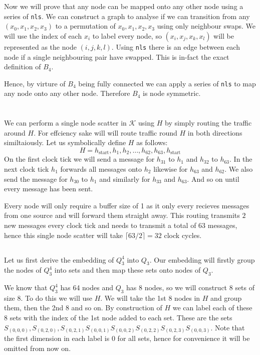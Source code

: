 Now we will prove that any node can be mapped onto any other node using a series of \texttt{nls}.
We can construct a graph to analyse if we can transition from any $(x_0, x_1, x_2, x_3)$ to a permutation of $x_0, x_1, x_2, x_3$ using only neighbour swaps.
We will use the index of each $x_i$ to label every node, so $(x_i, x_j, x_k, x_l)$ will be represented as the node $(i,j,k,l)$.
Using \texttt{nls} there is an edge between each node if a single neighbouring pair have swapped.
This is in-fact the exact definition of $B_4$.

Hence, by virture of $B_4$ being fully connected we can apply a series of \texttt{nls} to map any node onto any other node. Therefore $B_4$ is node symmetric.

\section{}
\subsection{}
We can perform a single node scatter in $\mathcal{K}$ using $H$  by simply routing the traffic around $H$.
For effciency sake will will route traffic round $H$ in both directions similtaiously.
Let us symbolically define $H$ as follows:
\[
H = h_{\text{start}}, h_1, h_2, \ldots, h_{62}, h_{63}, h_{\text{start}}
\]
On the first clock tick we will send a message for $h_{31}$ to $h_1$ and $h_{32}$ to $h_63$.
In the next clock tick $h_1$ forwards all messages onto $h_2$ likewise for $h_{63}$ and $h_{62}$.
We also send the message for $h_{30}$ to $h_1$ and similarly for $h_{33}$ and $h_{63}$.
And so on until every message has been sent.

Every node will only require a buffer size of 1 as it only every recieves messages from one source and will forward them straight away.
This routing transmits $2$ new messages every clock tick and needs to transmit a total of $63$ messages, hence this single node scatter will take $\lceil 63/2 \rceil=32$ clock cycles.


\subsection{}
Let us first derive the embedding of $Q^4_3$ into $Q_3$.
Our embedding will firstly group the nodes of $Q_3^4$ into sets and then map these sets onto nodes of $Q_3$.

We know that $Q^4_3$ has 64 nodes and $Q_3$ has 8 nodes, so we will construct 8 sets of size 8.
To do this we will use $H$.
We will take the 1st 8 nodes in $H$ and group them, then the 2nd 8 and so on.
By construction of $H$ we can label each of these 8 sets with the index of the 1st node added to each set.
These are the sets $S_{(0,0,0)}, S_{(0,2,0)}, S_{(0,2,1)} S_{(0,0,1)} S_{(0,0,2)} S_{(0,2,2)} S_{(0,2,3)} S_{(0,0,3)}$.
Note that the first dimension in each label is $0$ for all sets, hence for convenience it will be omitted from now on. 


